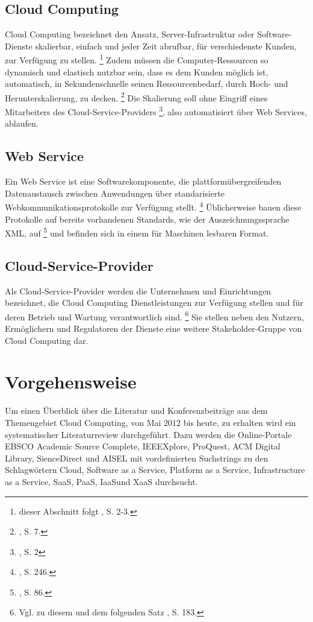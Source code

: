 \documentclass[
	a4paper,
	oneside,
	12pt,
	liststotocnumbered
]{article}
\let\cite\textcite
\begin{document}
\subsection{Cloud Computing}
Cloud Computing bezeichnet den Ansatz, Server-Infrastruktur oder Software-Dienste skalierbar, einfach und jeder Zeit abrufbar, für verschiedenste Kunden, zur Verfügung zu stellen.
\footnote{dieser Abschnitt folgt \cite{Mell.2011}, S. 2-3.}
Zudem müssen die Computer-Ressourcen so dynamisch und elastisch nutzbar sein, dass es dem Kunden möglich ist, automatisch, in Sekundenschnelle seinen Ressourcenbedarf, durch Hoch- und Herunterskalierung, zu decken.
\footnote{\cite{Boss.2007}, S. 7.}
Die Skalierung soll ohne Eingriff eines Mitarbeiters des Cloud-Service-Providers
\footnote{\cite{Mell.2011}, S. 2}, also automatisiert über Web Services, ablaufen.

\subsection{Web Service}
Ein Web Service ist eine Softwarekomponente, die plattformübergreifenden Datenaustausch zwischen Anwendungen über standarisierte Webkommunikationsprotokolle zur Verfügung stellt.
\footnote{\cite{Laudon.2010}, S. 246.}
Üblicherweise bauen diese Protokolle auf bereits vorhandenen Standards, wie der Auszeichnungssprache \acs{XML}, auf
\footnote{\cite{Curbera.2002}, S. 86.}  
und befinden sich in einem für Maschinen lesbaren Format.

\subsection{Cloud-Service-Provider}
Als Cloud-Service-Provider werden die Unternehmen und Einrichtungen bezeichnet, die Cloud Computing Dienstleistungen zur Verfügung stellen und für deren Betrieb und Wartung verantwortlich sind.
\footnote{Vgl. zu diesem und dem folgenden Satz \cite{Marston.2011}, S. 183.} 
Sie stellen neben den Nutzern, Ermöglichern und Regulatoren der Dienste eine weitere Stakeholder-Gruppe von Cloud Computing dar.


\section{Vorgehensweise}
Um einen Überblick über die Literatur und Konferenzbeiträge aus dem Themengebiet Cloud Computing, von Mai 2012 bis heute, zu erhalten wird ein systematischer Literaturreview durchgeführt. Dazu werden die Online-Portale EBSCO Academic Source Complete, IEEEXplore, ProQuest, ACM Digital Library, SienceDirect und AISEL mit vordefinierten Suchstrings zu den Schlagwörtern 
\glqq Cloud\grqq,
\glqq Software as a Service\grqq,
\glqq Platform as a Service\grqq,
\glqq Infrastructure as a Service\grqq,
\glqq \acs{SaaS}\grqq,
\glqq \acs{PaaS}\grqq,
\glqq \acs{IaaS}\grqq\addspace und
\glqq \acs{XaaS}\grqq
durchsucht.
\end{document}
